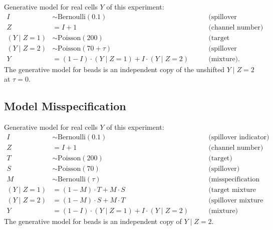 \documentclass[
]{article}
\begin{document}
Generative model for real cells \(Y\) of this experiment:
\[
\begin{aligned}
I              & \sim \text{Bernoulli}(0.1)                            & \qquad \text{(spillover indicator)} \\
Z              & = I + 1                                               & \qquad \text{(channel number)} \\
(Y \mid Z = 1) & \sim \text{Poisson}(200)                              & \qquad \text{(target component)} \\
(Y \mid Z = 2) & \sim \text{Poisson}(70+\tau)                          & \qquad \text{(spillover component with shift)} \\
Y              & = (1-I) \cdot (Y \mid Z = 1) + I \cdot (Y \mid Z = 2) & \qquad \text{(mixture)}.
\end{aligned}
\]
The generative model for beads is an independent copy of the unshifted \(Y \mid Z = 2\) at \(\tau = 0\).

\subsection*{Model Misspecification}\label{model-misspecification}

Generative model for real cells \(Y\) of this experiment:
\[
\begin{aligned}
I              & \sim \text{Bernoulli}(0.1)                            & \qquad \text{(spillover indicator)} \\
Z              & = I + 1                                               & \qquad \text{(channel number)} \\
T              & \sim \text{Poisson}(200)                              & \qquad \text{(target)} \\
S              & \sim \text{Poisson}(70)                               & \qquad \text{(spillover)} \\
M              & \sim \text{Bernoulli}(\tau)                           & \qquad \text{(misspecification indicator)} \\
(Y \mid Z = 1) & = (1-M) \cdot T + M \cdot S                           & \qquad \text{(target mixture component)} \\
(Y \mid Z = 2) & = (1-M) \cdot S + M \cdot T                           & \qquad \text{(spillover mixture component)} \\
Y              & = (1-I) \cdot (Y \mid Z = 1) + I \cdot (Y \mid Z = 2) & \qquad \text{(mixture)}
\end{aligned}
\]
The generative model for beads is an independent copy of \(Y \mid Z = 2\).
\end{document}

